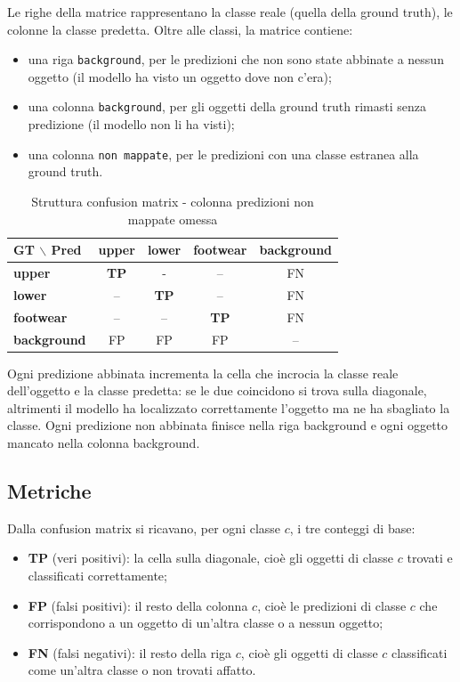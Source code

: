\noindent
Le righe della matrice rappresentano la classe reale (quella della ground truth), le colonne la classe predetta. Oltre alle classi, la matrice contiene:
\begin{itemize}
  \item una riga \texttt{background}, per le predizioni che non sono state abbinate a nessun oggetto (il modello ha visto un oggetto dove non c'era);
  \item una colonna \texttt{background}, per gli oggetti della ground truth rimasti senza predizione (il modello non li ha visti);
  \item una colonna \texttt{non mappate}, per le predizioni con una classe estranea alla ground truth.
\end{itemize}

\begin{table}[htbp]
  \centering
  \renewcommand{\arraystretch}{1.3}
  \begin{tabular}{lcccc}
    \toprule
    \textbf{GT $\backslash$ Pred} & \textbf{upper} & \textbf{lower} & \textbf{footwear} & \textbf{background} \\
    \midrule
    \textbf{upper}      & \textbf{TP} & - & -- & FN \\
    \textbf{lower}      & -- & \textbf{TP} & -- & FN \\
    \textbf{footwear}   & -- & -- & \textbf{TP} & FN \\
    \textbf{background} & FP & FP & FP & -- \\
    \bottomrule
  \end{tabular}
  \caption{Struttura confusion matrix - colonna predizioni non mappate omessa}
  \label{tab:confusion_matrix}
\end{table}

\noindent
Ogni predizione abbinata incrementa la cella che incrocia la classe reale dell'oggetto e la classe predetta: se le due coincidono si trova sulla diagonale, altrimenti il modello ha localizzato correttamente l'oggetto
ma ne ha sbagliato la classe. Ogni predizione non abbinata finisce nella riga background e ogni oggetto mancato nella colonna background.

\newpage

\subsection{Metriche}

\noindent
Dalla confusion matrix si ricavano, per ogni classe $c$, i tre conteggi di base:
\begin{itemize}
  \item \textbf{TP} (veri positivi): la cella sulla diagonale, cioè gli oggetti di classe $c$ trovati e classificati correttamente;
  \item \textbf{FP} (falsi positivi): il resto della colonna $c$, cioè le predizioni di classe $c$ che corrispondono a un oggetto di un'altra classe o a nessun oggetto;
  \item \textbf{FN} (falsi negativi): il resto della riga $c$, cioè gli oggetti di classe $c$ classificati come un'altra classe o non trovati affatto.
\end{itemize}

